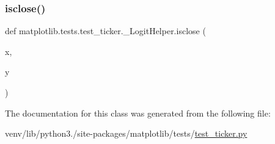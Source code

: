 \mbox{\label{classmatplotlib_1_1tests_1_1test__ticker_1_1__LogitHelper_a34d99e0af5177a855d47f774fcb8301c}} 
\subsubsection{\texorpdfstring{isclose()}{isclose()}}
{\footnotesize\ttfamily def matplotlib.\+tests.\+test\+\_\+ticker.\+\_\+\+Logit\+Helper.\+isclose (\begin{DoxyParamCaption}\item[{}]{x,  }\item[{}]{y }\end{DoxyParamCaption})\hspace{0.3cm}{\ttfamily [static]}}



The documentation for this class was generated from the following file\+:\begin{DoxyCompactItemize}
\item 
venv/lib/python3./site-\/packages/matplotlib/tests/\hyperlink{test__ticker_8py}{test\+\_\+ticker.\+py}\end{DoxyCompactItemize}
